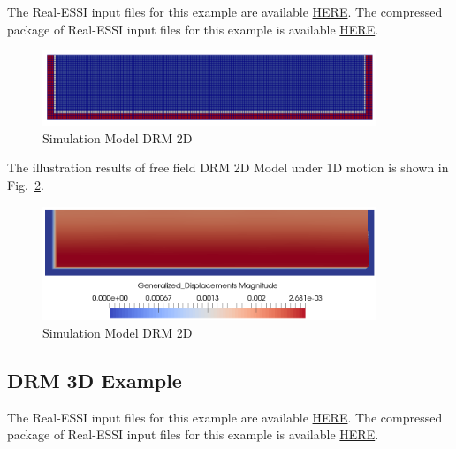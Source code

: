 The Real-ESSI input files for this example are available 
\href{https://github.com/yuan-energy/Real-ESSI-Short-Course-Examples/blob/master/short-course-examples/Day1/Preprocess_examples_with_Gmsh/DRM2D}{HERE}. 
The compressed package of Real-ESSI input files for this example is available 
\href{https://github.com/yuan-energy/Real-ESSI-Short-Course-Examples/blob/master/short-course-examples/Day1/Preprocess_examples_with_Gmsh/DRM2D/DRM2D.tgz?raw=true}{HERE}. 

\begin{figure}[H]
  \centering
  \includegraphics[width = 10cm]{./Figure-files/Day1/Preprocess_examples_with_Gmsh/example3/overview.png}
  \caption{Simulation Model DRM 2D}
  \label{fig_gmsh_ex3}
\end{figure}

The illustration results of free field DRM 2D Model under 1D motion is shown 
in Fig.~\ref{fig_day1_DRM2D_results}. 

\begin{figure}[H]
  \centering
  \includegraphics[width = 10cm]{./Figure-files/Day1/Preprocess_examples_with_Gmsh/example3/DRM2D_results.png}
  \caption{Simulation Model DRM 2D}
  \label{fig_day1_DRM2D_results}
\end{figure}

\clearpage
\newpage
\subsection{DRM 3D Example}


The Real-ESSI input files for this example are available 
\href{https://github.com/yuan-energy/Real-ESSI-Short-Course-Examples/blob/master/short-course-examples/Day1/Preprocess_examples_with_Gmsh/DRM3D}{HERE}. 
The compressed package of Real-ESSI input files for this example is available 
\href{https://github.com/yuan-energy/Real-ESSI-Short-Course-Examples/blob/master/short-course-examples/Day1/Preprocess_examples_with_Gmsh/DRM3D/DRM3D.tgz?raw=true}{HERE}. 

